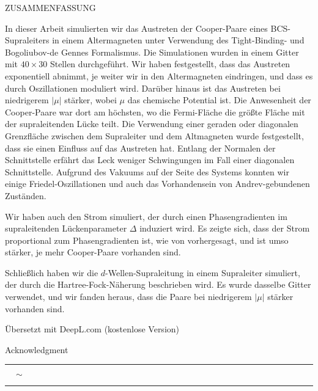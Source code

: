 \documentclass[../main.tex]{subfile}
\begin{document}
\newpage
\thispagestyle{empty}
\vspace*{24pt}
\begin{center}
    \LARGE ZUSAMMENFASSUNG \normalsize\vspace{24pt}\\
\end{center}
In dieser Arbeit simulierten wir das Austreten der Cooper-Paare eines BCS-Supraleiters \cite{FossheimSudbo2004} in einem Altermagneten \cite{Smejkal2022} unter Verwendung des Tight-Binding- und
Bogoliubov-de Gennes Formalismus. Die Simulationen wurden in einem Gitter mit $40 \times 30$ Stellen durchgeführt.
Wir haben festgestellt, dass das Austreten exponentiell abnimmt, je weiter wir in den Altermagneten eindringen, und dass es durch Oszillationen moduliert wird.
Darüber hinaus ist das Austreten bei niedrigerem $|\mu|$ stärker, wobei $\mu$ das chemische Potential ist. Die Anwesenheit der Cooper-Paare war dort am höchsten, wo 
die Fermi-Fläche die größte Fläche mit der supraleitenden Lücke teilt. Die Verwendung einer geraden oder diagonalen Grenzfläche
zwischen dem Supraleiter und dem Altmagneten wurde festgestellt, dass sie einen Einfluss auf das Austreten hat. Entlang der Normalen der Schnittstelle
erfährt das Leck weniger Schwingungen im Fall einer diagonalen Schnittstelle. Aufgrund des Vakuums auf der Seite des Systems konnten wir einige Friedel-Oszillationen und auch
das Vorhandensein von Andrev-gebundenen Zuständen.

Wir haben auch den Strom simuliert, der durch einen Phasengradienten im supraleitenden Lückenparameter $\Delta$ induziert wird.
Es zeigte sich, dass der Strom proportional zum Phasengradienten ist, wie von \cite{Orlando2003} vorhergesagt,
und ist umso stärker, je mehr Cooper-Paare vorhanden sind.

Schließlich haben wir die $d$-Wellen-Supraleitung \cite{Mjos2019} in einem Supraleiter simuliert, der durch die Hartree-Fock-Näherung beschrieben wird.
Es wurde dasselbe Gitter verwendet, und wir fanden heraus, dass die Paare bei niedrigerem $|\mu|$ stärker vorhanden sind.

Übersetzt mit DeepL.com (kostenlose Version)

\newpage
\thispagestyle{empty}
\vspace*{24pt}
\begin{center}
    \LARGE Acknowledgment \normalsize\vspace{24pt}\\
    \rule[3pt]{0.04\textwidth}{0.2pt} $\quad\sim\quad$\rule[3pt]{.04\textwidth}{0.2pt} 
\end{center}
\vspace*{12pt}
\end{document}
